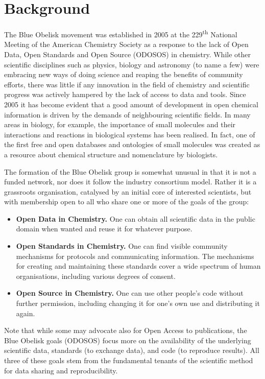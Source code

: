 \documentclass[10pt]{bmc_article}
\newenvironment{bmcformat}{\fussy\setboolean{publ}{true}}{\fussy}
\begin{document}
\begin{bmcformat}
\section*{Background}
The Blue Obelisk movement was established in 2005 at the
229\textsuperscript{th} National Meeting of the American Chemistry
Society as a response to the lack of Open Data, Open Standards and
Open Source (ODOSOS) in chemistry. While other scientific disciplines
such as physics, biology and astronomy (to name a few) were embracing
new ways of doing science and reaping the benefits of community
efforts, there was little if any innovation in the field of chemistry
and scientific progress was actively hampered by the lack of access to
data and tools.
Since 2005 it has become evident that a good amount of development in open
chemical information is driven by the demands of neighbouring
scientific fields. In many areas in biology, for example, the importance of
small molecules and their interactions and reactions in biological systems
has been realised. In fact, one of the first free and open databases and ontologies
of small molecules was created as a resource about chemical structure and nomenclature
by biologists.\cite{DeMatos:2009p3839}

The formation of the Blue Obelisk group is somewhat unusual in that it
is not a funded network, nor does it follow the industry consortium
model. Rather it is a grassroots organisation, catalysed by an initial
core of interested scientists, but with membership open to all who
share one or more of the goals of the group:
\begin{itemize}
\item {\bf Open Data in Chemistry.} One can obtain all scientific data in the public domain when
wanted and reuse it for whatever purpose.
\item {\bf Open Standards in Chemistry.} One can find visible community mechanisms for
protocols and communicating information. The mechanisms for creating
and maintaining these standards cover a wide spectrum of human
organisations, including various degrees of consent.
\item {\bf Open Source in Chemistry.} One can use other people's code without further
permission, including changing it for one's own use and distributing
it again.
\end{itemize}

Note that while some may advocate also for Open Access to
publications, the Blue Obelisk goals (ODOSOS) focus more on the
availability of the underlying scientific data, standards (to exchange
data), and code (to reproduce results). All three of these goals stem
from the fundamental tenants of the scientific method for data sharing
and reproducibility.


\end{bmcformat}
\end{document}
